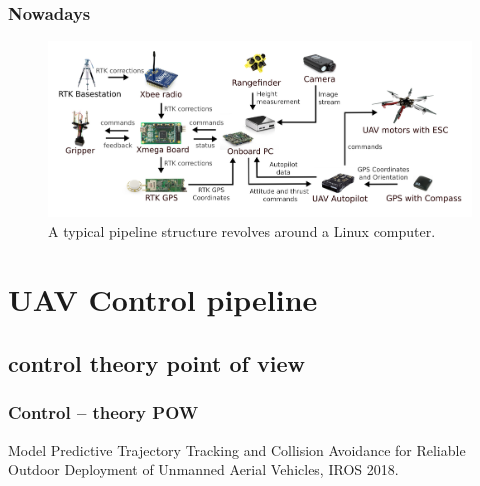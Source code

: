 \documentclass{beamer}
\begin{document}
\begin{frame}
  \frametitle{Nowadays}

  \begin{figure}
    \caption{A typical pipeline structure revolves around a Linux computer.}
    \includegraphics[width=1.0\textwidth]{./fig/components.png}
  \end{figure}

\end{frame}


\section{UAV Control pipeline}
\subsection{control theory point of view}

\begin{frame}
  \frametitle{Control -- theory POW}

  \centering
  \begin{figure}
    \begin{adjustbox}{max totalsize={1.0\textwidth}{.85\textheight}, center}
      
    \end{adjustbox}
  \end{figure}

  \begin{block}{\cite{iros}}
    Model Predictive Trajectory Tracking and Collision Avoidance for Reliable Outdoor Deployment of Unmanned Aerial Vehicles, IROS 2018.
  \end{block}

\end{frame}
\end{document}
